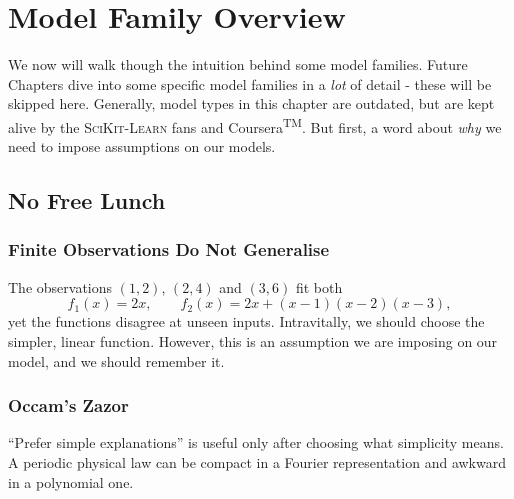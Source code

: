 \chapter{Model Family Overview}
\label{chap:models}

We now will walk though the intuition behind some model families.
Future Chapters dive into some specific model families in a \textit{lot} of detail - these will be skipped here.
Generally, model types in this chapter are outdated, but are kept alive by the \textsc{SciKit-Learn} fans and Coursera\textsuperscript{TM}. 
But first, a word about \textit{why} we need to impose assumptions on our models. 


\section{No Free Lunch}
\label{chap:nfl}

\subsection{Finite Observations Do Not Generalise}
\label{sec:nfl-why-finite-observations-are-not-enough}
The observations $(1,2)$, $(2,4)$ and $(3,6)$ fit both
\[
    f_1(x)=2x,
    \qquad
    f_2(x)=2x+(x-1)(x-2)(x-3),
\]
yet the functions disagree at unseen inputs.
Intravitally, we should choose the simpler, linear function.
However, this is an assumption we are imposing on our model, and we should remember it.

\subsection{Occam's Zazor}
\label{sec:nfl-occam-s-razor-is-also-a-bias}
``Prefer simple explanations'' is useful only after choosing what simplicity means.
A periodic physical law can be compact in a Fourier representation and awkward in a polynomial one.

